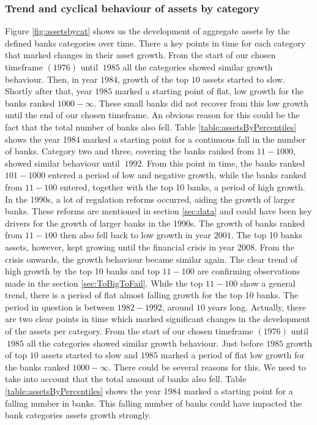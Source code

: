 \documentclass[12pt, a4paper]{article} %
\begin{document}
\subsubsection{Trend and cyclical behaviour of assets by category}
Figure \ref{fig:assetsbycat} shows us the development of aggregate assets by the defined banks categories over time. 
There a key points in time for each category that marked changes in their asset growth. From the start of our chosen timeframe $(1976)$ until $~1985$ all the categories showed similar growth behaviour. Then, in year $1984$, growth of the top $10$ assets started to slow. Shortly after that, year $1985$ marked a starting point of flat, low growth for the banks ranked $1000-\infty$. These small banks did not recover from this low growth until the end of our chosen timeframe. An obvious reason for this could be the fact that the  total number of banks also fell. Table \ref{table:assetsByPercentiles} shows the year 1984 marked a starting point for a continuous fall in the number of banks. Category two and three, covering the banks ranked from $11-1000$, showed similar behaviour until $~1992$. From this point in time, the banks ranked $101-1000$ entered a period of low and negative growth, while the banks ranked from $11-100$ entered, together with the top 10 banks, a period of high growth. In the 1990s, a lot of regulation reforms occurred, aiding the growth of larger banks. These reforms are mentioned in section \ref{sec:data} and could have been key drivers for the growth of larger banks in the 1990s.
The growth of banks ranked from $11-100$ then also fell back to low growth in year $2001$. The top 10 banks assets, however, kept growing until the financial crisis in year 2008. 
\iffalse
From the crisis onwards, the growth behaviour became similar again.  
The clear trend of high growth by the top 10 banks and top $11-100$ are confirming observations made in the section \ref{sec:ToBigToFail}. While the top $11-100$ show a general trend, there is a period of flat almost falling growth for the top 10 banks. The period in question is between $1982-1992$, around $10$ years long. Actually, there are two clear points in time which marked significant changes in the development of the assets per category. From the start of our chosen timeframe $(1976)$ until $~1985$ all the categories showed similar growth behaviour. Just before $1985$ growth of top $10$ assets started to slow and $1985$ marked a period of flat low growth for the banks ranked $1000-\infty$. There could be several reasons for this. We need to take into account that the total amount of banks also fell. Table \ref{table:assetsByPercentiles} shows the year 1984 marked a starting point for a falling number in banks. This falling number of banks could have impacted the bank categories assets growth strongly. 
\end{document}
